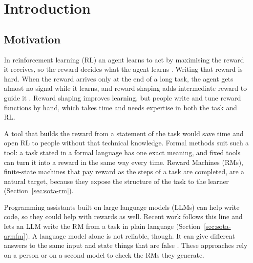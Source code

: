 \documentclass[11pt,english,listoffigures,listoftables]{tfgetsinf}
\begin{document}

\mainmatter


\chapter{Introduction}
\label{chap:introduction}
\section{Motivation}
In reinforcement learning (RL) an agent learns to act by maximising the reward it receives, so the reward decides what the agent learns \cite{sutton2018reinforcement}. Writing that reward is hard. When the reward arrives only at the end of a long task, the agent gets almost no signal while it learns, and reward shaping adds intermediate reward to guide it \cite{ng1999policy}. Reward shaping improves learning, but people write and tune reward functions by hand, which takes time and needs expertise in both the task and RL.

A tool that builds the reward from a statement of the task would save time and open RL to people without that technical knowledge. Formal methods suit such a tool: a task stated in a formal language has one exact meaning, and fixed tools can turn it into a reward in the same way every time. Reward Machines (RMs), finite-state machines that pay reward as the steps of a task are completed, are a natural target, because they expose the structure of the task to the learner (Section~\ref{sec:sota-rm}).

Programming assistants built on large language models (LLMs) can help write code, so they could help with rewards as well. Recent work follows this line and lets an LLM write the RM from a task in plain language \cite{creus2026armfm} (Section~\ref{sec:sota-armfm}). A language model alone is not reliable, though. It can give different answers to the same input \cite{ouyang2025empirical} and state things that are false \cite{huang2025survey}. These approaches rely on a person or on a second model to check the RMs they generate.
\end{document}
